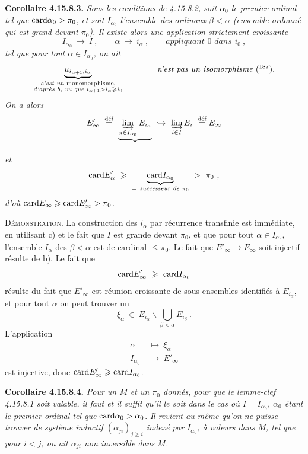 \textbf{Corollaire 4.15.8.3.} \textit{Sous les conditions de 4.15.8.2, soit $\alpha_0$ le premier ordinal tel que} $\mathrm{card} \alpha_0 > \pi_0$, \textit{et soit $I_{\alpha_0}$ l'ensemble des ordinaux $\beta < \alpha$ (ensemble ordonné qui est grand devant $\pi_0$). Il existe alors une application strictement croissante}
\[
I_{\alpha_0} \ \longrightarrow \ I \ , \qquad \alpha \ \longmapsto \ i_\alpha \ , \qquad \textit{appliquant } 0 \textit{ dans } i_0 \ ,
\]
\textit{tel que pour tout $\alpha \in I_{\alpha_0}$, on ait}
\[
\underbrace{u_{i_{\alpha+1},i_\alpha}}_{\substack{\textit{c'est un } \text{monomorphisme,}\\ \textit{d'après b, vu que } i_{\alpha+1} > i_\alpha \geqslant i_0}} \qquad\qquad \text{\textit{n'est pas un isomorphisme} (\footnotemark[187]).}
\]
\textit{On a alors}
\[
E'_\infty \ \overset{\text{déf}}{=} \ \underbrace{\varinjlim_{\alpha\in I_{\alpha_0}} E_{i_\alpha}}_{} \ \hookrightarrow \ \varinjlim_{i\in I} E_i \ \overset{\text{déf}}{=} E_\infty
\]
\textit{et}
\[
\card E'_\alpha \ \geqslant \ \underbrace{\card I_{\alpha_0}}_{=\ \textit{successeur de } \pi_0} \ > \ \pi_0 \ ,
\] %
\textit{d'où} $\mathrm{card} E_\infty \geqslant \mathrm{card} E'_\infty > \pi_0$.

\textsc{Démonstration}. La construction des $i_\alpha$ par récurrence transfinie est immédiate, en utilisant c) et le fait que $I$ est grande devant $\pi_0$, et que pour tout $\alpha \in I_{\alpha_0}$, l'ensemble $I_\alpha$
des $\beta < \alpha$ est de cardinal $\leqslant \pi_0$. Le fait que $E'_\infty \longrightarrow E_\infty$ soit injectif résulte de b). Le fait que
\[
\mathrm{card} E'_\infty \ \geqslant \ \mathrm{card} I_{\alpha_0}
\]
résulte du fait que $E'_\infty$ est réunion croissante de sous-ensembles identifiés à $E_{i_\alpha}$, et pour tout
$\alpha$ on peut trouver un
\[
\xi_\alpha \ \in \ E_{i_\alpha}\backslash \bigcup_{\beta<\alpha} E_{i_\beta} \ .
\]
L'application
\[
\begin{aligned}
\alpha \ &\longmapsto \ \xi_\alpha\\
I_{\alpha_0} \ &\longrightarrow \ E'_\infty
\end{aligned}
\]
est injective, donc $\mathrm{card} E'_\infty \geqslant \mathrm{card} I_{\alpha_0}$.

\textbf{Corollaire 4.15.8.4.} \textit{Pour un $M$ et un $\pi_0$ donnés, pour que le lemme-clef 4.15.8.1 soit valable, il faut et il suffit qu'il le soit dans le cas où $I = I_{\alpha_0}$, $\alpha_0$ étant le premier ordinal tel que} $\mathrm{card} \alpha_0 > \alpha_0$. \textit{Il revient au même qu'on ne puisse trouver de système inductif $(\alpha_{ji})_{j\geqslant i}$ indexé par $I_{\alpha_0}$, à valeurs dans $M$, tel que pour $i < j$, on ait $\alpha_{ji}$ non inversible dans $M$.} %

